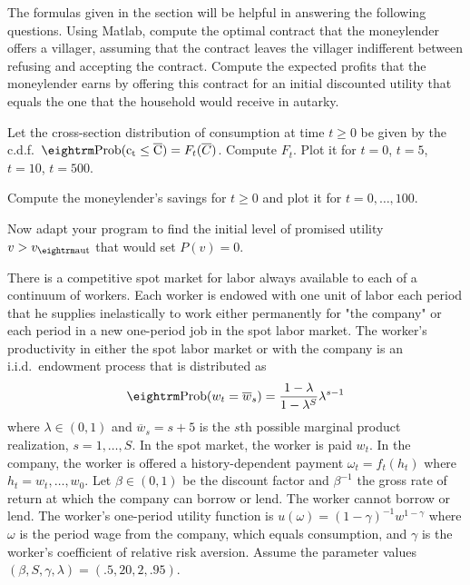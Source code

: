 \medskip
{}  The formulas given in the section 
will be helpful in answering the following questions.
\medskip
{} Using Matlab,    compute the optimal   contract that the
moneylender offers a villager, assuming that the contract
leaves the villager indifferent between refusing and accepting the
contract.
\medskip
{}  Compute the expected profits   that
the moneylender earns by offering this contract for an initial
discounted utility  that equals the one that the household
would receive in autarky.

\medskip
{}  Let the cross-section distribution
of consumption at time $t \geq 0$   be
given by the c.d.f.\ ${\rm Prob ( c_t \leq \overline C)}
= F_t (\overline C)$.  Compute $F_t$.  Plot it for
$t=0$, $t=5$, $t=10$, $t=500$.

\medskip
{} Compute the  moneylender's  savings for $t \geq 0$
and plot it for $t=0, \ldots, 100$.

\medskip
{}  Now adapt your program to find the
initial level of promised utility $v > v_{\rm aut}$ that would
set $P(v)=0$.

\medskip

\medskip
{} 
\medskip
\noindent There is a competitive spot market for labor always
available to each of a continuum of workers. Each worker is
endowed with one unit of labor each period that he supplies
inelastically to work either permanently for "the company" or each
period in  a new one-period job in the spot labor market. The
worker's  productivity in either the  spot labor market or with
the company is an i.i.d.\ endowment process that is distributed as
$$ {\rm Prob} (w_t = \overline w_s) = {1-\lambda\over 1-\lambda^S }
 \lambda^{s-1}  $$
where $\lambda \in (0,1)$ and $\overline w_s = s+5$ is the $s$th
possible marginal product realization, $s=1, \ldots, S$. In the
spot market, the worker is paid $w_t$.  In the company, the worker
is offered a history-dependent payment $\omega_t = f_t(h_t)$ where
$h_t = w_t, \ldots, w_0$. Let $\beta\in (0,1)$ be the discount
factor and $\beta^{-1}$ the gross rate of return at which the
company can borrow or lend. The worker cannot borrow or lend. The
worker's one-period utility function is $u(\omega) =
(1-\gamma)^{-1} w^{1-\gamma}$ where $\omega$ is the  period wage
from the company, which equals   consumption, and  $\gamma$ is the
worker's coefficient of relative risk aversion. Assume the
parameter values $(\beta, S, \gamma, \lambda) = (.5, 20, 2,
.95)$. %


